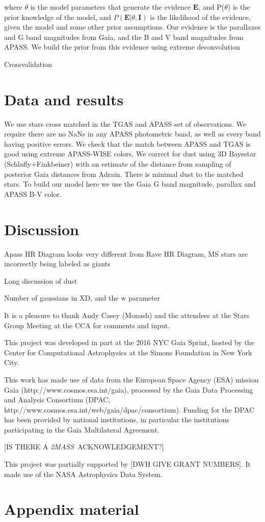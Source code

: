 \documentclass[12pt, preprint]{aastex6}
\newcommand{\acronym}[1]{{\small{#1}}}
\newcommand{\project}[1]{\textsl{#1}}
\newcommand{\tmass}{\project{\acronym{2MASS}}}
\begin{document}
where $\theta$ is the model parameters that generate the evidence $\textbf{E}$, and P($\theta$) is the prior knowledge of the model, and $P(\textbf{E} |\theta,\textbf{I})$ is the likelihood of the evidence, given the model and some other prior assumptions. Our evidence is the parallaxes and G band magnitudes from Gaia, and the B and V band magnitudes from APASS. We build the prior from this evidence using extreme deconvolution


Crossvalidation

\section{Data and results}

We use stars cross matched in the TGAS and APASS set of observations. We require there are no NaNs in any APASS photometric band, as well as every band having positive errors. We check that the match between APASS and TGAS is good using extreme APASS-WISE colors. We correct for dust using 3D Bayestar (Schlafly+Finkbeiner) with an estimate of the distance from sampling of posterior Gaia distances from Adrain. There is minimal dust to the matched stars. To build our model here we use the Gaia G band magnitude, parallax and APASS B-V color.

\section{Discussion}
Apass HR Diagram looks very different from Rave HR Diagram, MS stars are incorrectly being labeled as giants

Long discussion of dust

Number of gaussians in XD, and the w parameter



\acknowledgments It is a pleasure to thank Andy Casey (Monash) and the
attendees at the Stars Group Meeting at the CCA for comments and
input.

This project was developed in part at the 2016 \acronym{NYC} Gaia Sprint, hosted
by the Center for Computational Astrophysics at the Simons Foundation
in New York City.

This work has made use of data from the European Space Agency (\acronym{ESA})
mission Gaia (http://www.cosmos.esa.int/gaia), processed by the Gaia
Data Processing and Analysis Consortium (\acronym{DPAC},
http://www.cosmos.esa.int/web/gaia/dpac/consortium). Funding for the
\acronym{DPAC} has been provided by national institutions, in particular the
institutions participating in the Gaia Multilateral Agreement.

[IS THERE A \tmass\ ACKNOWLEDGEMENT?]

This project was partially supported by [DWH GIVE GRANT NUMBERS]. It
made use of the \acronym{NASA} Astrophysics Data System.

\appendix

\section{Appendix material}


\begin{thebibliography}{}
\end{thebibliography}

\clearpage
\end{document}
